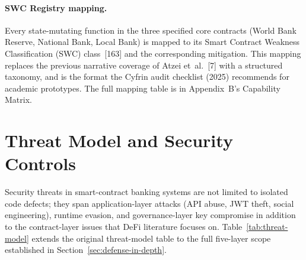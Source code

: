 \documentclass[12pt,a4paper]{report}
\begin{document}
\paragraph{SWC Registry mapping.}
Every state-mutating function in the three specified core contracts (World Bank Reserve, National Bank, Local Bank) is mapped to its Smart Contract Weakness Classification (SWC) class~[163] and the corresponding mitigation. This mapping replaces the previous narrative coverage of Atzei et~al.~[7] with a structured taxonomy, and is the format the Cyfrin audit checklist (2025) recommends for academic prototypes. The full mapping table is in Appendix~B's Capability Matrix.

\section{Threat Model and Security Controls}
\label{sec:threat-model}

Security threats in smart-contract banking systems are not limited to isolated code defects; they span application-layer attacks (API abuse, JWT theft, social engineering), runtime evasion, and governance-layer key compromise in addition to the contract-layer issues that DeFi literature focuses on. Table~\ref{tab:threat-model} extends the original threat-model table to the full five-layer scope established in Section~\ref{sec:defense-in-depth}.
\end{document}
